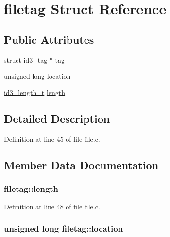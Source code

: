 \hypertarget{structfiletag}{}\section{filetag Struct Reference}
\label{structfiletag}
\subsection*{Public Attributes}
\begin{DoxyCompactItemize}
\item 
struct \hyperlink{structid3__tag}{id3\+\_\+tag} $\ast$ \hyperlink{structfiletag_a1864ce9078af1273318ffa8433a6fbda}{tag}
\item 
unsigned long \hyperlink{structfiletag_ae8314338aa5fdfb2dff6d88d24fe682b}{location}
\item 
\hyperlink{id3tag_8h_a26fddaa5bcd55c38142a1fbed8d2835d}{id3\+\_\+length\+\_\+t} \hyperlink{structfiletag_ac578d5fb35403dbf832963a603c24117}{length}
\end{DoxyCompactItemize}


\subsection{Detailed Description}


Definition at line 45 of file file.\+c.



\subsection{Member Data Documentation}
\subsubsection[{\texorpdfstring{length}{length}}]{ filetag\+::length}\hypertarget{structfiletag_ac578d5fb35403dbf832963a603c24117}{}\label{structfiletag_ac578d5fb35403dbf832963a603c24117}


Definition at line 48 of file file.\+c.

\subsubsection[{\texorpdfstring{location}{location}}]{\setlength{\rightskip}{0pt plus 5cm}unsigned long filetag\+::location}\hypertarget{structfiletag_ae8314338aa5fdfb2dff6d88d24fe682b}{}\label{structfiletag_ae8314338aa5fdfb2dff6d88d24fe682b}


